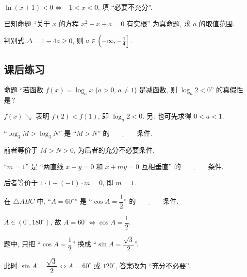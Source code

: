   \beginsolution
    $\ln(x+1)<0\Leftrightarrow -1<x<0$, 填 ``必要不充分''. 
  \endsolution
  
  \begin{exercise}
    已知命题 ``关于 $x$ 的方程 $x^2 +x+a=0$ 有实根'' 为真命题, 求 $a$ 的取值范围.
  \end{exercise}

  \beginsolution
    判别式 $\Delta= 1-4a\geqslant 0$, 则 $a\in\Bigl(-\infty,-\frac14\Bigr]$.
  \endsolution
  
  \subsection{课后练习}
  \begin{exercise}
    命题 ``若函数 $f(x)=\log_ a x$ ($a>0$, $a\neq 1$) 是减函数,
    则 $\log_a 2<0$'' 的真假性是\,?
  \end{exercise}

  \beginsolution
    $f(x)\searrow$ 表明 $f(2)<f(1)$, 即 $\log_a 2<0$. 另: 也可先求得 $0<a<1$.
  \endsolution
  
  \begin{exercise}
    ``$\log_3 M>\log_3 N$'' 是 ``$M>N$'' 的$\underline{\qquad\qquad}$条件.
  \end{exercise}

  \beginsolution
    前者等价于 $M>N>0$, 为后者的充分不必要条件.
  \endsolution
  
  \begin{exercise}
    ``$m=1$'' 是 ``两直线 $x-y=0$ 和 $x+my=0$ 互相垂直'' 
    的$\underline{\qquad\qquad}$条件.
  \end{exercise}

  \beginsolution
    后者等价于 $1\cdot 1+(-1)\cdot m=0$, 即 $m=1$.
  \endsolution
  
  \begin{exercise}
    在 $\triangle ABC$ 中, ``$A=60^\circ$'' 是 ``$\cos A= \dfrac12$'' 
    的$\underline{\qquad\qquad}$条件.
  \end{exercise}

  \beginsolution
    $A\in(0^\circ, 180^\circ)$, 故 $A=60^\circ\Leftrightarrow\cos A= \dfrac12$.
    
    \varexercise 题中, 只把 ``$\cos A= \dfrac12$'' 换成 ``$\sin A= \dfrac{\sqrt3}2$''. 
    
    此时 $\sin A= \dfrac{\sqrt3}2\Leftrightarrow A=60^\circ$ 或 $120^\circ$, 答案改为 ``充分不必要''.
  \endsolution
  
